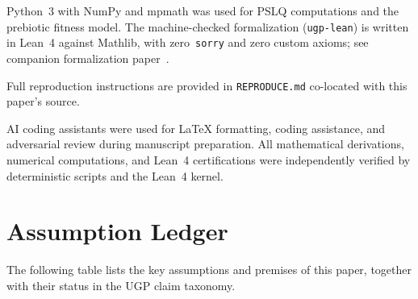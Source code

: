 \documentclass[11pt]{article}
\theoremstyle{remark}
\begin{document}
Python~3 with NumPy and mpmath was used for PSLQ computations
and the prebiotic fitness model.
The machine-checked formalization (\texttt{ugp-lean}) is written in Lean~4
against Mathlib, with zero~\texttt{sorry} and zero custom axioms;
see companion formalization paper~\cite{SpivackUGPFormalization}.

Full reproduction instructions are provided in \texttt{REPRODUCE.md} co-located with this paper's source.

AI coding assistants were used for LaTeX formatting, coding assistance, and adversarial review during manuscript preparation. All mathematical derivations, numerical computations, and Lean~4 certifications were independently verified by deterministic scripts and the Lean~4 kernel.

\appendix

\section{Assumption Ledger}
\label{app:assumptions}

The following table lists the key assumptions and premises of this paper,
together with their status in the UGP claim taxonomy.
\end{document}
